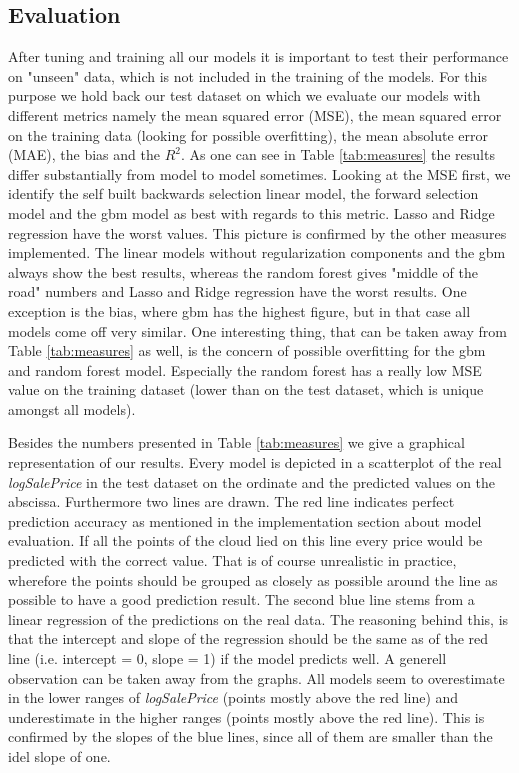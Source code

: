 \subsection{Evaluation}
After tuning and training all our models it is important to test their performance on "unseen" data, which is not included in the training of the models. For this purpose we hold back our test dataset on which we evaluate our models with different metrics namely the mean squared error (MSE), the mean squared error on the training data (looking for possible overfitting), the mean absolute error (MAE), the bias and the $R^2$. As one can see in Table \ref{tab:measures} the results differ substantially from model to model sometimes. Looking at the MSE first, we identify the self built backwards selection linear model, the forward selection model and the gbm model as best with regards to this metric. Lasso and Ridge regression have the worst values. This picture is confirmed by the other measures implemented. The linear models without regularization components and the gbm always show the best results, whereas the random forest gives "middle of the road" numbers and Lasso and Ridge regression have the worst results. One exception is the bias, where gbm has the highest figure, but in that case all models come off very similar. One interesting thing, that can be taken away from Table \ref{tab:measures} as well, is the concern of possible overfitting for the gbm and random forest model. Especially the random forest has a really low MSE value on the training dataset (lower than on the test dataset, which is unique amongst all models). 



Besides the numbers presented in Table \ref{tab:measures} we give a graphical representation of our results. Every model is depicted in a scatterplot of the real \textit{logSalePrice} in the test dataset on the ordinate and the predicted values on the abscissa. Furthermore two lines are drawn. The red line indicates perfect prediction accuracy as mentioned in the implementation section about model evaluation. If all the points of the cloud lied on this line every price would be predicted with the correct value. That is of course unrealistic in practice, wherefore the points should be grouped as closely as possible around the line as possible to have a good prediction result. The second blue line stems from a linear regression of the predictions on the real data. The reasoning behind this, is that the intercept and slope of the regression should be the same as of the red line (i.e. intercept = 0, slope = 1) if the model predicts well. A generell observation can be taken away from the graphs. All models seem to overestimate in the lower ranges of \textit{logSalePrice} (points mostly above the red line) and underestimate in the higher ranges (points mostly above the red line). This is confirmed by the slopes of the blue lines, since all of them are smaller than the idel slope of one. 





